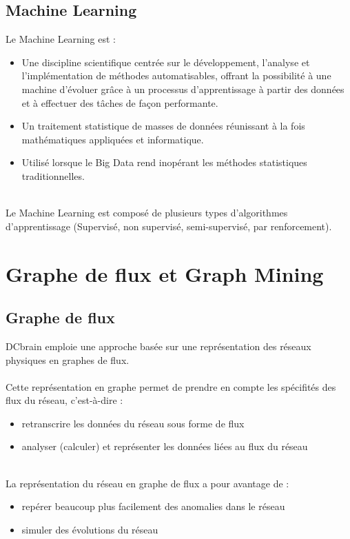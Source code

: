 	\subsection{Machine Learning}
	\begin{frame}
		\begin{block}{Le Machine Learning est :}
			\begin{itemize}	
				\pause \item Une discipline scientifique centrée sur le développement, l’analyse et l’implémentation de méthodes automatisables, offrant la possibilité à une machine d’évoluer grâce à un processus d’apprentissage à partir des données et à effectuer des tâches de façon performante.
				\pause\item Un traitement statistique de masses de données réunissant à la fois mathématiques appliquées et informatique.
				\pause\item Utilisé lorsque le Big Data rend inopérant les méthodes statistiques traditionnelles.
			\end{itemize}
		\end{block}
		~\\
		\pause
		Le Machine Learning est composé de plusieurs types d'algorithmes d’apprentissage (Supervisé, non supervisé, semi-supervisé, par renforcement).
	\end{frame}
	
	\section{Graphe de flux et Graph Mining}
	\subsection{Graphe de flux}
	\begin{frame}
		DCbrain emploie une approche basée sur une représentation des réseaux physiques en graphes de flux.\\~\\
		\pause
		Cette représentation en graphe permet de prendre en compte les spécifités des flux du réseau, c'est-à-dire :
		\begin{itemize}
		\pause
		\item retranscrire les données du réseau sous forme de flux
		\pause
		\item analyser (calculer) et représenter les données liées au flux du réseau
		\end{itemize}
		~\\
		\pause
		La représentation du réseau en graphe de flux a pour avantage de : 
		\begin{itemize}
		\pause
		\item repérer beaucoup plus facilement des anomalies dans le réseau
		\pause
		\item simuler des évolutions du réseau
		\end{itemize}
	\end{frame}
	
